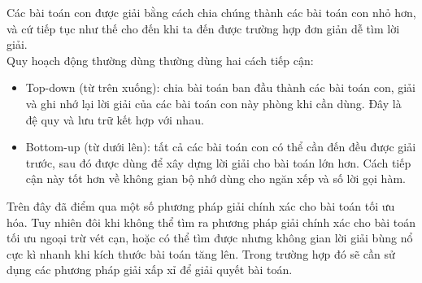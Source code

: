 Các bài toán con được giải bằng cách chia chúng thành các bài toán con nhỏ hơn, và cứ tiếp tục như thế cho đến khi ta đến được trường hợp đơn giản dễ tìm lời giải.
\\Quy hoạch động thường dùng thường dùng hai cách tiếp cận:
\begin{itemize}
    \item Top-down (từ trên xuống): chia bài toán ban đầu thành các bài toán con, giải và ghi nhớ lại lời giải của các bài toán con này phòng khi cần dùng. Đây là đệ quy và lưu trữ kết hợp với nhau.
    \item Bottom-up (từ dưới lên): tất cả các bài toán con có thể cần đến đều được giải trước, sau đó được dùng để xây dựng lời giải cho bài toán lớn hơn. Cách tiếp cận này tốt hơn về không gian bộ nhớ dùng cho ngăn xếp và số lời gọi hàm. 
\end{itemize}
Trên đây đã điểm qua một số phương pháp giải chính xác cho bài toán tối ưu hóa. Tuy nhiên đôi khi không thể tìm ra phương pháp giải chính xác cho bài toán tối ưu ngoại trừ vét cạn, hoặc có thể tìm được nhưng không gian lời giải bùng nổ cực kì nhanh khi kích thước bài toán tăng lên. Trong trường hợp đó sẽ cần sử dụng các phương pháp giải xấp xỉ để giải quyết bài toán.

